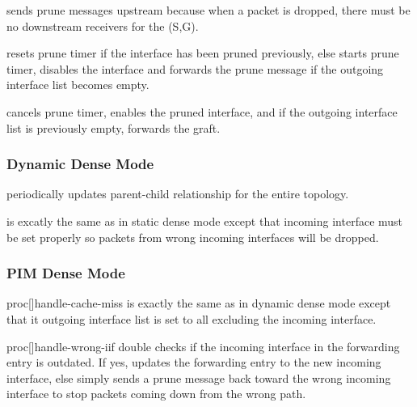 sends prune messages upstream because when a packet is
dropped, there must be no downstream receivers for the (S,G).

 resets prune timer if the interface has been pruned
previously, else starts prune timer, disables the interface and forwards
the prune message if the outgoing interface list becomes empty.

 cancels prune timer, enables the pruned interface, and
if the outgoing interface list is previously empty, forwards the graft.


\subsubsection{Dynamic Dense Mode}

 periodically updates parent-child relationship for
the entire topology.

 is excatly the same as in static dense mode
except that incoming interface must be set properly so packets from wrong
incoming interfaces will be dropped.

\subsubsection{PIM Dense Mode}
proc[]{handle-cache-miss} is exactly the same as in dynamic dense mode
except that it outgoing interface list is set to all excluding the
incoming interface.

proc[]{handle-wrong-iif} double checks if the incoming interface in the
forwarding entry is outdated.  If yes,  updates
the forwarding entry to the new incoming interface, else simply sends a
prune message back toward the wrong incoming interface to stop packets
coming down from the wrong path.

\endinput

